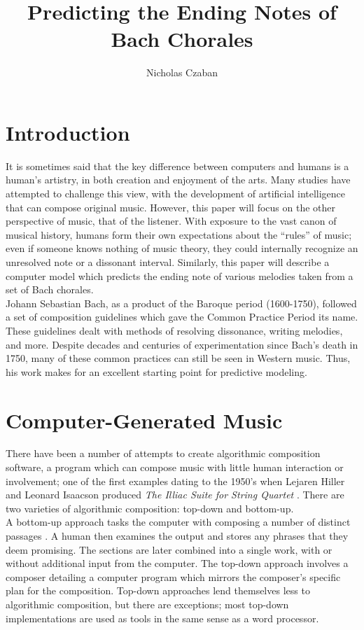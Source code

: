 \documentclass[12pt]{article}
\begin{document}
\title{Predicting the Ending Notes of Bach Chorales}
\author{Nicholas Czaban}
\maketitle

\section{Introduction}
It is sometimes said that the key difference between computers and humans is a human's artistry, in both creation and enjoyment of the arts. Many studies have attempted to challenge this view, with the development of artificial intelligence that can compose original music. However, this paper will focus on the other perspective of music, that of the listener. With exposure to the vast canon of musical history, humans form their own expectations about the ``rules'' of music; even if someone knows nothing of music theory, they could internally recognize an unresolved note or a dissonant interval. Similarly, this paper will describe a computer model which predicts the ending note of various melodies taken from a set of Bach chorales.\\

Johann Sebastian Bach, as a product of the Baroque period (1600-1750), followed a set of composition guidelines which gave the Common Practice Period its name. These guidelines dealt with methods of resolving dissonance, writing melodies, and more. Despite decades and centuries of experimentation since Bach's death in 1750, many of these common practices can still be seen in Western music. Thus, his work makes for an excellent starting point for predictive modeling. 

\section{Computer-Generated Music}
There have been a number of attempts to create algorithmic composition software, a program which can compose music with little human interaction or involvement; one of the first examples dating to the 1950's when Lejaren Hiller and Leonard Isaacson produced {\it The Illiac Suite for String Quartet} \cite{computers}. There are two varieties of algorithmic composition: top-down and bottom-up.\\

A bottom-up approach tasks the computer with composing a number of distinct passages \cite{computers}. A human then examines the output and stores any phrases that they deem promising. The sections are later combined into a single work, with or without additional input from the computer. The top-down approach involves a composer detailing a computer program which mirrors the composer's specific plan for the composition. Top-down approaches lend themselves less to algorithmic composition, but there are exceptions; most top-down implementations are used as tools in the same sense as a word processor.
\end{document}
